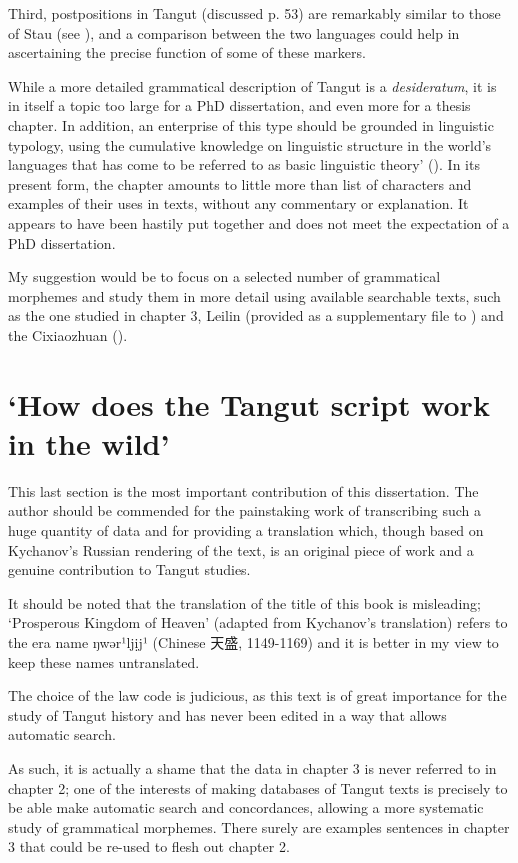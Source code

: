 \documentclass[oneside,a4paper,11pt]{article}
\newcommand{\ipa}[1]{{\phon#1}} %
\newcommand{\zh}[1]{{\cn#1}}
\newcommand{\tgf}[1]{\ruby{{\mo{#1}}}{#1}}
\begin{document}
 Third, postpositions in Tangut (discussed p. 53) are remarkably similar to those of Stau (see \citealt{jacques17stau}), and a comparison between the two languages could help in ascertaining the precise function of some of these markers.

While a more detailed grammatical description of Tangut is a \textit{desideratum}, it is in itself a topic too large for a PhD dissertation, and even more for a thesis chapter. In addition, an enterprise of this type should be grounded in linguistic typology, using the cumulative knowledge on linguistic structure in the world's languages that has come to be referred to as  basic linguistic theory' (\citealt{dixon10basic2}). In its present form, the chapter amounts to little more than list of characters and examples of their uses in texts, without any commentary or explanation. It appears to have been hastily put together and does not meet the expectation of a PhD dissertation.

My suggestion would be to focus on a selected number of grammatical morphemes and study them in more detail using available searchable texts, such as the one studied in chapter 3, Leilin (provided as a supplementary file to \citealt{jacques16th}) and the Cixiaozhuan (\citealt{jacques07textes}).

\section{`How does the Tangut script work in the wild'}
This last section is the most important contribution of this dissertation. The author should be commended for the painstaking work of transcribing such a huge quantity of data and for providing a translation which, though based on Kychanov's Russian rendering of the text, is an original piece of work and a genuine contribution to Tangut studies.

It should be noted that the translation of the title of this book is misleading; `Prosperous Kingdom of Heaven' (adapted from Kychanov's translation) refers to the era name \tgf{0510}\tgf{0496} \ipa{ ŋwər¹ljịj¹} (Chinese \zh{天盛}, 1149-1169) and it is better in my view to keep these names untranslated.

The choice of the law code is judicious, as this text is of great importance for the study of Tangut history and has never been edited in a way that allows automatic search.

As such, it is actually a shame that the data in chapter  3 is never referred to in chapter 2; one of the interests of making databases of Tangut texts is precisely to be able make automatic search and concordances, allowing a more systematic study of grammatical morphemes. There surely are examples sentences in chapter 3 that could be re-used to flesh out chapter 2.
\end{document}
